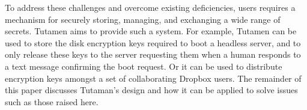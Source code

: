 To address these challenges and overcome existing deficiencies, users
requires a mechanism for securely storing, managing, and exchanging a
wide range of secrets. Tutamen aims to provide such a system. For
example, Tutamen can be used to store the disk encryption keys
required to boot a headless server, and to only release these keys to
the server requesting them when a human responds to a text message
confirming the boot request. Or it can be used to distribute
encryption keys amongst a set of collaborating Dropbox users. The
remainder of this paper discusses Tutaman's design and how it can be
applied to solve issues such as those raised here.

